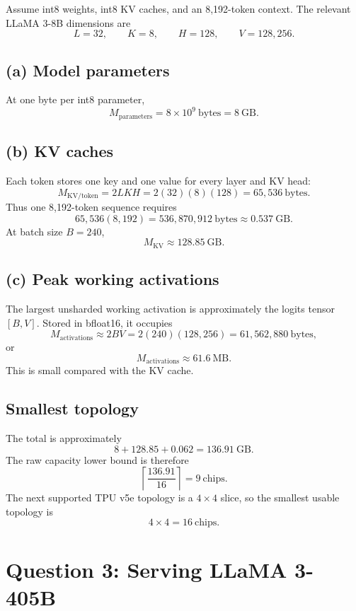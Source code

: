 \documentclass[11pt]{article}
\begin{document}
Assume int8 weights, int8 KV caches, and an 8,192-token context. The relevant
LLaMA 3-8B dimensions are
\[
L=32,\qquad K=8,\qquad H=128,\qquad V=128{,}256.
\]

\subsection*{(a) Model parameters}

At one byte per int8 parameter,
\[
\boxed{M_{\mathrm{parameters}}=8\times10^9\ \text{bytes}=8\ \text{GB}}.
\]

\subsection*{(b) KV caches}

Each token stores one key and one value for every layer and KV head:
\[
M_{\mathrm{KV/token}}
=2LKH
=2(32)(8)(128)
=65{,}536\ \text{bytes}.
\]
Thus one 8,192-token sequence requires
\[
65{,}536(8{,}192)
=536{,}870{,}912\ \text{bytes}
\approx0.537\ \text{GB}.
\]
At batch size \(B=240\),
\[
\boxed{M_{\mathrm{KV}}\approx128.85\ \text{GB}}.
\]

\subsection*{(c) Peak working activations}

The largest unsharded working activation is approximately the logits tensor
\([B,V]\). Stored in bfloat16, it occupies
\[
M_{\mathrm{activations}}
\approx2BV
=2(240)(128{,}256)
=61{,}562{,}880\ \text{bytes},
\]
or
\[
\boxed{M_{\mathrm{activations}}\approx61.6\ \text{MB}}.
\]
This is small compared with the KV cache.

\subsection*{Smallest topology}

The total is approximately
\[
8+128.85+0.062=136.91\ \text{GB}.
\]
The raw capacity lower bound is therefore
\[
\left\lceil\frac{136.91}{16}\right\rceil=9\ \text{chips}.
\]
The next supported TPU v5e topology is a \(4\times4\) slice, so the smallest
usable topology is
\[
\boxed{4\times4=16\ \text{chips}}.
\]

\section*{Question 3: Serving LLaMA 3-405B}
\end{document}
